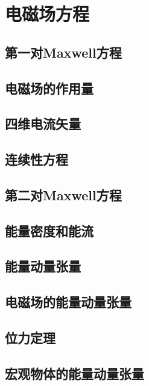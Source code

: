 \chapter{电磁场方程}

\section{第一对Maxwell方程}

\section{电磁场的作用量}

\section{四维电流矢量}

\section{连续性方程}

\section{第二对Maxwell方程}

\section{能量密度和能流}

\section{能量动量张量}

\section{电磁场的能量动量张量}

\section{位力定理}

\section{宏观物体的能量动量张量}